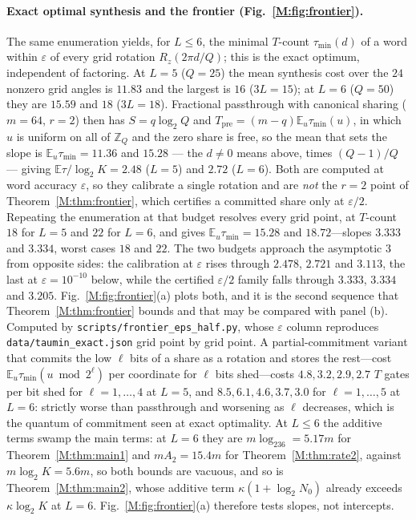 \documentclass[aps,prx,twocolumn,superscriptaddress,nofootinbib,longbibliography]{revtex4-2}
\theoremstyle{plain}
\theoremstyle{definition}
\theoremstyle{remark}
\newcommand{\Tpre}{T_{\mathrm{pre}}}
\newcommand{\E}{\mathbb{E}}
\newcommand{\Z}{\mathbb{Z}}
\begin{document}
\paragraph{Exact optimal synthesis and the frontier (Fig.~\ref{M:fig:frontier}).} The same enumeration yields, for $L\le6$, the minimal $T$-count $\tau_{\min}(d)$ of a word within $\varepsilon$ of every grid rotation $R_z(2\pi d/Q)$; this is the exact optimum, independent of factoring. At $L=5$ ($Q=25$) the mean synthesis cost over the $24$ nonzero grid angles is $11.83$ and the largest is $16$ ($3L=15$); at $L=6$ ($Q=50$) they are $15.59$ and $18$ ($3L=18$). Fractional passthrough with canonical sharing ($m=64$, $r=2$) then has $S=q\log_2Q$ and $\Tpre=(m-q)\E_u\tau_{\min}(u)$, in which $u$ is uniform on all of $\Z_Q$ and the zero share is free, so the mean that sets the slope is $\E_u\tau_{\min}=11.36$ and $15.28$ --- the $d\ne0$ means above, times $(Q-1)/Q$ --- giving $\E\tau/\log_2K=2.48$ ($L=5$) and $2.72$ ($L=6$). Both are computed at word accuracy $\varepsilon$, so they calibrate a single rotation and are \emph{not} the $r=2$ point of Theorem~\ref{M:thm:frontier}, which certifies a committed share only at $\varepsilon/2$. Repeating the enumeration at that budget resolves every grid point, at $T$-count $18$ for $L=5$ and $22$ for $L=6$, and gives $\E_u\tau_{\min}=15.28$ and $18.72$---slopes $3.333$ and $3.334$, worst cases $18$ and $22$. The two budgets approach the asymptotic $3$ from opposite sides: the calibration at $\varepsilon$ rises through $2.478$, $2.721$ and $3.113$, the last at $\varepsilon=10^{-10}$ below, while the certified $\varepsilon/2$ family falls through $3.333$, $3.334$ and $3.205$. Fig.~\ref{M:fig:frontier}(a) plots both, and it is the second sequence that Theorem~\ref{M:thm:frontier} bounds and that may be compared with panel (b). Computed by \texttt{scripts/frontier\_eps\_half.py}, whose $\varepsilon$ column reproduces \texttt{data/taumin\_exact.json} grid point by grid point. A partial-commitment variant that commits the low $\ell$ bits of a share as a rotation and stores the rest---cost $\E_u\tau_{\min}(u\bmod2^\ell)$ per coordinate for $\ell$ bits shed---costs $4.8,3.2,2.9,2.7$ $T$ gates per bit shed for $\ell=1,\dots,4$ at $L=5$, and $8.5,6.1,4.6,3.7,3.0$ for $\ell=1,\dots,5$ at $L=6$: strictly worse than passthrough and worsening as $\ell$ decreases, which is the quantum of commitment seen at exact optimality. At $L\le6$ the additive terms swamp the main terms: at $L=6$ they are $m\log_236=5.17m$ for Theorem~\ref{M:thm:main1} and $mA_2=15.4m$ for Theorem~\ref{M:thm:rate2}, against $m\log_2K=5.6m$, so both bounds are vacuous, and so is Theorem~\ref{M:thm:main2}, whose additive term $\kappa(1+\log_2N_0)$ already exceeds $\kappa\log_2K$ at $L=6$. Fig.~\ref{M:fig:frontier}(a) therefore tests slopes, not intercepts.
\end{document}
